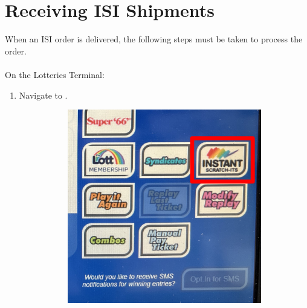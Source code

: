 \documentclass[a4paper, 12pt]{article}
\begin{document}
\section{Receiving ISI Shipments}
When an ISI order is delivered, the following steps must be taken to process the order.
\\
\\
On the Lotteries Terminal:
\begin{enumerate}
    \item Navigate to .
    \begin{figure}[h]
    \centering
        \hfill
        \begin{subfigure}{0.3\linewidth}
            \centering
            \includegraphics[width=\linewidth]{images/lotteriesmain.JPG}
        \end{subfigure}
        \hfill
        \begin{subfigure}[b]{0.3\linewidth}
            \centering

\end{subfigure}
\end{figure}
\end{enumerate}
\end{document}
